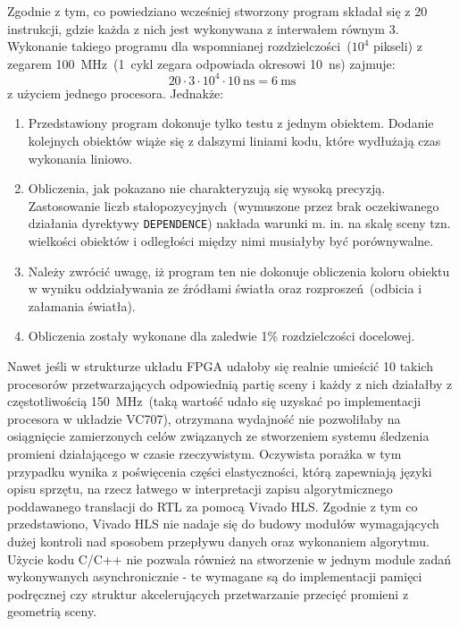 Zgodnie z tym, co powiedziano wcześniej stworzony program składał się z 20 instrukcji, gdzie każda z nich jest wykonywana z interwałem równym 3. Wykonanie takiego programu dla wspomnianej rozdzielczości~($10^4$ pikseli) z zegarem 100~MHz~(1~cykl zegara odpowiada okresowi 10~ns) zajmuje:
\begin{equation}
20\cdot 3 \cdot 10^4 \cdot 10\ \mathrm{ns} = 6\ \mathrm{ms}
\end{equation}
z użyciem jednego procesora. Jednakże:
\begin{enumerate}
\item Przedstawiony program dokonuje tylko testu z jednym obiektem. Dodanie kolejnych obiektów wiąże się z dalszymi liniami kodu, które wydłużają czas wykonania liniowo.
\item Obliczenia, jak pokazano nie charakteryzują się wysoką precyzją. Zastosowanie liczb stałopozycyjnych~(wymuszone przez brak oczekiwanego działania dyrektywy \texttt{DEPENDENCE}) nakłada warunki m. in. na skalę sceny tzn. wielkości obiektów i odległości między nimi musiałyby być porównywalne.
\item Należy zwrócić uwagę, iż program ten nie dokonuje obliczenia koloru obiektu w wyniku oddziaływania ze źródłami światła oraz rozproszeń~(odbicia i załamania światła).
\item Obliczenia zostały wykonane dla zaledwie 1\% rozdzielczości docelowej.
\end{enumerate}
Nawet jeśli w strukturze układu FPGA udałoby się realnie umieścić 10 takich procesorów przetwarzających odpowiednią partię sceny i każdy z nich działałby z częstotliwością 150~MHz~(taką wartość udało się uzyskać po implementacji procesora w układzie VC707), otrzymana wydajność nie pozwoliłaby na osiągnięcie zamierzonych celów związanych ze stworzeniem systemu śledzenia promieni działającego w czasie rzeczywistym. Oczywista porażka w tym przypadku wynika z poświęcenia części elastyczności, którą zapewniają języki opisu sprzętu, na rzecz łatwego w interpretacji zapisu algorytmicznego poddawanego translacji do RTL za pomocą Vivado HLS. Zgodnie z tym co przedstawiono, Vivado HLS nie nadaje się do budowy modułów wymagających dużej kontroli nad sposobem przepływu danych oraz wykonaniem algorytmu. Użycie kodu C/C++ nie pozwala również na stworzenie w jednym module zadań wykonywanych asynchronicznie - te wymagane są do implementacji pamięci podręcznej czy struktur akcelerujących przetwarzanie przecięć promieni z geometrią sceny.


